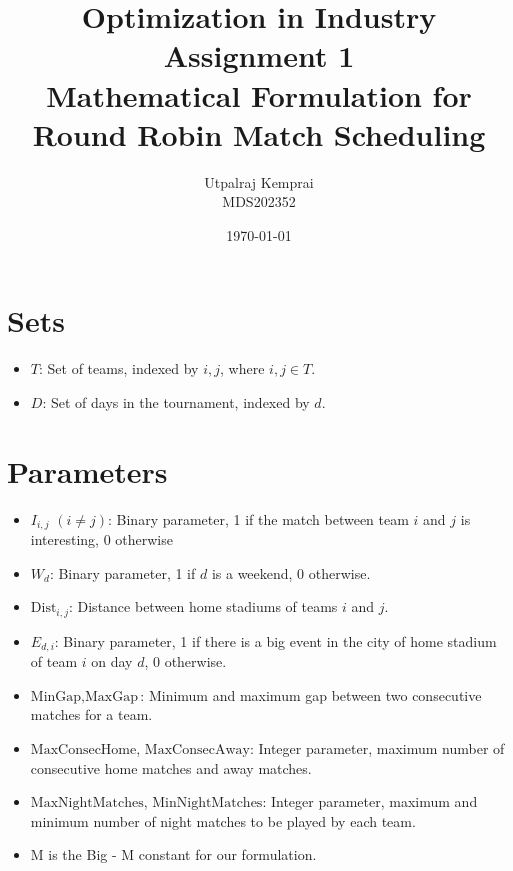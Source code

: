 \documentclass[a4paper, 12pt]{article}
\title{Optimization in Industry Assignment 1 \\ Mathematical Formulation for Round Robin Match Scheduling}
\author{Utpalraj Kemprai \\ MDS202352}
\date{\today}
\begin{document}
\maketitle

\section*{Sets}
\begin{itemize}
    \item $T$: Set of teams, indexed by $i, j$, where $i, j \in T$.
    \item $D$: Set of days in the tournament, indexed by $d$.
\end{itemize}

\section*{Parameters}
\begin{itemize}
    \item $I_{i,j}$ $(i \neq j)$: Binary parameter, 1 if the match between team $i$ and $j$ is interesting, 0 otherwise
    \item $W_{d}$: Binary parameter, 1 if $d$ is a weekend, 0 otherwise.
    \item $\text{Dist}_{i,j}$: Distance between home stadiums of teams $i$ and $j$.
    \item $E_{d,i}$: Binary parameter, 1 if there is a big event in the city of home stadium of team $i$ on day $d$, 0 otherwise.
    \item $\text{MinGap}, \text{MaxGap}$: Minimum and maximum gap between two consecutive matches for a team.
    \item $\text{MaxConsecHome}$, $\text{MaxConsecAway}$: Integer parameter, maximum number of consecutive home matches and away matches.
    \item $\text{MaxNightMatches}$, $\text{MinNightMatches}$: Integer parameter, maximum and minimum number of night matches to be played by each team.
    \item M is the Big - M constant for our formulation.
\end{itemize}
\end{document}
